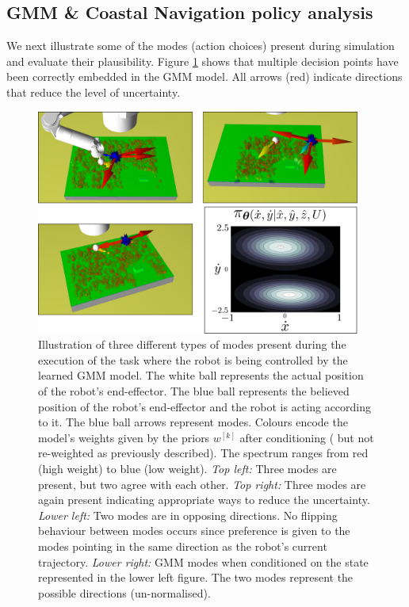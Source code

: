 \FloatBarrier
\subsection{GMM \& Coastal Navigation policy analysis}\label{sub:policy_analysis}

We next illustrate some of the modes (action choices) present during simulation and evaluate their 
plausibility. Figure \ref{fig:modes} shows that multiple decision points have been correctly embedded in the GMM model. All
arrows (red) indicate directions that reduce the level of uncertainty. 

\begin{figure}
    \centering
    \includegraphics[width=0.95\textwidth]{./ch3-Search/Figures/Figure9_m}
    \caption{Illustration of three different types of modes present during the
    execution of the task where the robot is being controlled by the learned GMM model.
    The white ball represents the actual position of the robot's end-effector. The blue ball represents the
    believed position of the robot's end-effector and the robot is acting according to it. 
    The blue ball arrows represent modes. Colours encode the model's weights given by the priors $w^{[k]}$ after conditioning ( but not re-weighted as
    previously described). The spectrum ranges from red (high weight) to blue (low weight). \textit{Top left:} Three modes are present, but two agree with each other.   
    \textit{Top right:} Three modes are again present indicating appropriate ways to reduce the uncertainty. \textit{Lower left:} Two modes are in opposing directions. 
    No flipping behaviour between modes occurs since preference is given to the modes pointing in the same direction as the robot's current trajectory. \textit{Lower right:} GMM modes when conditioned on the state represented in the lower left figure.
    The two modes represent the possible directions (un-normalised).}
   \label{fig:modes}
\end{figure}

